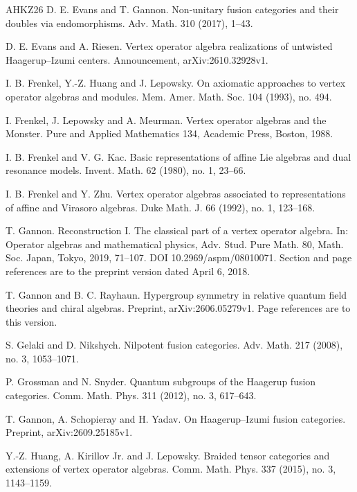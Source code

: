 \documentclass[leqno]{article}
\numberwithin{equation}{section}
\begin{document}
\begin{thebibliography}{AHKZ26}
D. E. Evans and T. Gannon.
\newblock Non-unitary fusion categories and their doubles via endomorphisms.
\newblock Adv. Math. 310 (2017), 1--43.

D. E. Evans and A. Riesen.
\newblock Vertex operator algebra realizations of untwisted Haagerup--Izumi centers.
\newblock Announcement, arXiv:2610.32928v1.

I. B. Frenkel, Y.-Z. Huang and J. Lepowsky.
\newblock On axiomatic approaches to vertex operator algebras and modules.
\newblock Mem. Amer. Math. Soc. 104 (1993), no. 494.

I. Frenkel, J. Lepowsky and A. Meurman.
\newblock Vertex operator algebras and the Monster.
\newblock Pure and Applied Mathematics 134, Academic Press, Boston, 1988.

I. B. Frenkel and V. G. Kac.
\newblock Basic representations of affine Lie algebras and dual resonance models.
\newblock Invent. Math. 62 (1980), no. 1, 23--66.

I. B. Frenkel and Y. Zhu.
\newblock Vertex operator algebras associated to representations of affine and Virasoro algebras.
\newblock Duke Math. J. 66 (1992), no. 1, 123--168.

T. Gannon.
\newblock Reconstruction I. The classical part of a vertex operator algebra.
\newblock In: Operator algebras and mathematical physics, Adv. Stud. Pure Math. 80, Math. Soc. Japan, Tokyo, 2019, 71--107. DOI 10.2969/aspm/08010071. Section and page references are to the preprint version dated April 6, 2018.

T. Gannon and B. C. Rayhaun.
\newblock Hypergroup symmetry in relative quantum field theories and chiral algebras.
\newblock Preprint, arXiv:2606.05279v1. Page references are to this version.

S. Gelaki and D. Nikshych.
\newblock Nilpotent fusion categories.
\newblock Adv. Math. 217 (2008), no. 3, 1053--1071.

P. Grossman and N. Snyder.
\newblock Quantum subgroups of the Haagerup fusion categories.
\newblock Comm. Math. Phys. 311 (2012), no. 3, 617--643.

T. Gannon, A. Schopieray and H. Yadav.
\newblock On Haagerup--Izumi fusion categories.
\newblock Preprint, arXiv:2609.25185v1.

Y.-Z. Huang, A. Kirillov Jr. and J. Lepowsky.
\newblock Braided tensor categories and extensions of vertex operator algebras.
\newblock Comm. Math. Phys. 337 (2015), no. 3, 1143--1159.


\end{thebibliography}
\end{document}
